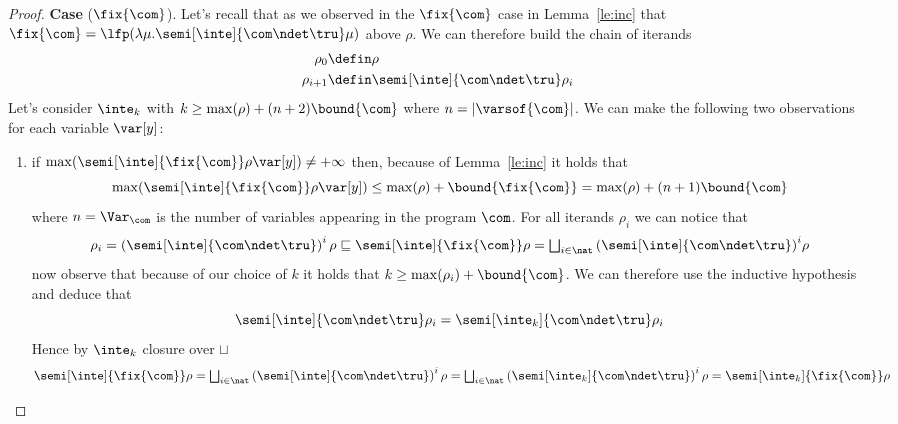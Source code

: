 \begin{proof}
  \noindent
  \textbf{Case} (\(\fix{\com}\)).
  Let's recall that as we observed in the \(\fix{\com}\) case in
  Lemma~\ref{le:inc} that
  \({\fix{\com} = \lfp(\lambda \mu . \semi[\inte]{\com \ndet
      \tru}\mu)}\) above \(\rho\). We can therefore build the chain of
  iterands
  \begin{align*}
    \rho_0 & \defin \rho \\
    \rho_{i+1} & \defin \semi[\inte]{\com \ndet \tru}\rho_i
  \end{align*}
  Let's consider \(\inte_k\) with
  \(k \geq \max(\rho) + (n+2)\bound{\com}\) where
  \(n = |\varsof{\com}|\). We can make the following two observations
  for each variable \(\var[y]\):
  \begin{enumerate}[label=(\roman*)]
  \item if
    \({\max(\semi[\inte]{\fix{\com}}\rho\var[y])} \neq +\infty\) then,
    because of Lemma~\ref{le:inc} it holds that
    \begin{equation*}
      \max(\semi[\inte]{\fix{\com}}\rho\var[y]) \leq \max(\rho) + \bound{\fix{\com}} = \max(\rho) + (n+1)\bound{\com}
    \end{equation*}
    where \(n = \Var_{\com}\) is the number of variables appearing in
    the program \(\com\). For all iterands \(\rho_i\) we can notice
    that
    \begin{equation*}
      \rho_i = \left(\semi[\inte]{\com \ndet \tru}\right)^i\rho \sqsubseteq \semi[\inte]{\fix{\com}}\rho = \textstyle\bigsqcup_{i\in\nat}{\left(\semi[\inte]{\com\ndet\tru}\right)}^i\rho
    \end{equation*}
    now observe that because of our choice of \(k\) it holds that
    \({k \geq \max(\rho_i) + \bound{\com}}\). We can therefore use the
    inductive hypothesis and deduce that
    \begin{equation*}
      \semi[\inte]{\com\ndet\tru}\rho_i = \semi[\inte_k]{\com\ndet\tru}\rho_i
    \end{equation*}
    Hence by \(\inte_k\) closure over \(\sqcup\)
    \begin{equation*}
      \semi[\inte]{\fix{\com}}\rho
      =
      \textstyle\bigsqcup_{i\in\nat}\left(\semi[\inte]{\com\ndet\tru}\right)^i\rho
      =
      \textstyle\bigsqcup_{i\in\nat}\left(\semi[\inte_k]{\com\ndet\tru}\right)^i\rho
      =
      \semi[\inte_k]{\fix{\com}}\rho
    \end{equation*}
    

\end{enumerate}
\end{proof}
